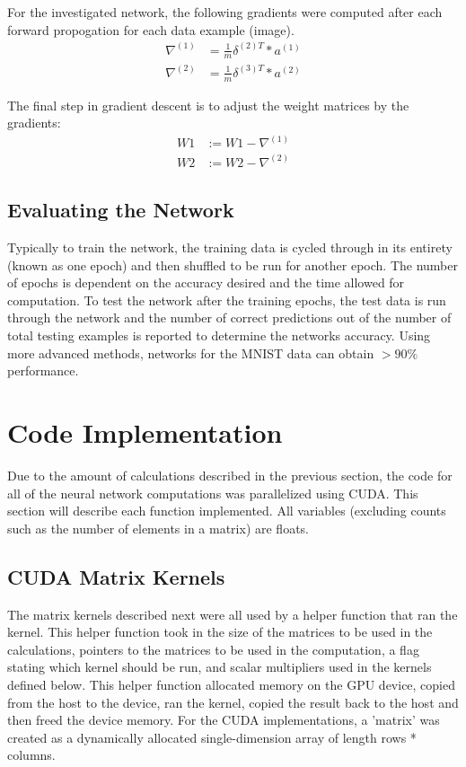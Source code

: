 \documentclass[11pt]{article}
\begin{document}
For the investigated network, the following gradients were computed after each forward propogation for each data example (image).
\begin{align*}
	\nabla^{(1)} & = \frac{1}{m} \delta^{(2)T}*a^{(1)} \\
	\nabla^{(2)} & = \frac{1}{m} \delta^{(3)T}*a^{(2)} 
\end{align*} 

The final step in gradient descent is to adjust the weight matrices by the gradients:
\begin{align*}
	W1 & := W1 - \nabla^{(1)} \\
	W2 & := W2 - \nabla^{(2)} 
\end{align*}

\subsection{Evaluating the Network}
Typically to train the network, the training data is cycled through in its entirety (known as one epoch) and then shuffled to be run for another epoch. The number of epochs is dependent on the accuracy desired and the time allowed for computation. To test the network after the training epochs, the test data is run through the network and the number of correct predictions out of the number of total testing examples is reported to determine the networks accuracy. Using more advanced methods, networks for the MNIST data can obtain $>90\%$ performance.

\section{Code Implementation}
Due to the amount of calculations described in the previous section, the code for all of the neural network computations was parallelized using CUDA. This section will describe each function implemented. All variables (excluding counts such as the number of elements in a matrix) are floats.

\subsection{CUDA Matrix Kernels}
The matrix kernels described next were all used by a helper function that ran the kernel. This helper function took in the size of the matrices to be used in the calculations, pointers to the matrices to be used in the computation, a flag stating which kernel should be run, and scalar multipliers used in the kernels defined below. This helper function allocated memory on the GPU device, copied from the host to the device, ran the kernel, copied the result back to the host and then freed the device memory. For the CUDA implementations, a 'matrix' was created as a dynamically allocated single-dimension array of length rows * columns.
\end{document}
